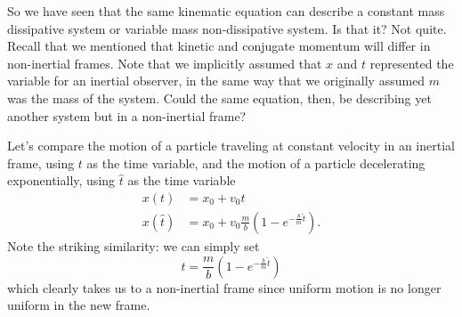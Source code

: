 So we have seen that the same kinematic equation can describe a constant mass dissipative system or variable mass non-dissipative system. Is that it? Not quite. Recall that we mentioned that kinetic and conjugate momentum will differ in non-inertial frames. Note that we implicitly assumed that $x$ and $t$ represented the variable for an inertial observer, in the same way that we originally assumed $m$ was the mass of the system. Could the same equation, then, be describing yet another system but in a non-inertial frame?

Let's compare the motion of a particle traveling at constant velocity in an inertial frame, using $t$ as the time variable, and the motion of a particle decelerating exponentially, using $\hat{t}$ as the time variable
\begin{equation}
	\begin{aligned}
		x(t) &= x_0 + v_0 t \\
		x(\hat{t}) &= x_0 + v_0 \frac{m}{b}\left(1-e^{-\frac{b}{m}\hat{t}}\right).
	\end{aligned}
\end{equation}
Note the striking similarity: we can simply set
\begin{equation}
	t = \frac{m}{b} \left(1-e^{-\frac{b}{m}\hat{t}}\right)
\end{equation}
which clearly takes us to a non-inertial frame since uniform motion is no longer uniform in the new frame.

